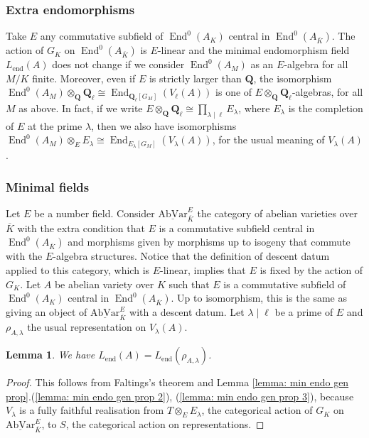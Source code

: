 \documentclass[a4paper,10pt]{amsart}
\theoremstyle{plain}
\newtheorem{lemma}[theorem]{Lemma}
\theoremstyle{definition}
\theoremstyle{remark}
\def\Q{\mathbf Q}
\newcommand{\Ql}{\Q_{\ell}}
\def\mr#1{\mathrm{#1}}
\def\AbVar{\underline{\mathrm{AbVar}}}
\DeclareMathOperator{\End}{End}
\begin{document}
\subsubsection{Extra endomorphisms}\label{sssec: extra end}
Take \(E\) any commutative subfield of \(\End^0(A_{K})\) central in \(\End^0(A_{\overline{K}})\). The action of \(G_K\) on \(\End^0(A_{\overline{K}})\) is \(E\)-linear and the minimal endomorphism field \(L_{\mr{end}}(A)\) does not change if we consider \(\End^0(A_{M})\) as an \(E\)-algebra for all \(M/K\) finite.
Moreover, even if \(E\) is strictly larger than \(\Q\), the isomorphism \(\End^0(A_{M}) \otimes_{\Q} \Ql \cong \End_{\Ql[G_M]}(V_\ell(A))\) is one of \(E \otimes_\Q \Ql\)-algebras, for all \(M\) as above. In fact, if we write \(E \otimes_\Q \Ql \cong \prod_{\lambda \mid \ell} E_\lambda\), where \(E_\lambda\) is the completion of \(E\) at the prime \(\lambda\), then we also have isomorphisms \(\End^0(A_{M}) \otimes_{E} E_{\lambda} \cong \End_{E_{\lambda}[G_M]}(V_\lambda(A))\), for the usual meaning of \(V_\lambda(A)\).

\subsubsection{Minimal fields}
Let \(E\) be a number field. Consider \(\AbVar_{\overline{K}}^E\) the category of abelian varieties over \(\overline{K}\) with the extra condition that \(E\) is a commutative subfield central in \(\End^0(A_{\overline{K}})\) and morphisms given by morphisms up to isogeny that commute with the \(E\)-algebra structures. Notice that the definition of descent datum applied to this category, which is \(E\)-linear, implies that \(E\) is fixed by the action of \(G_K\). Let \(A\) be abelian variety over \(K\) such that \(E\) is a commutative subfield of \(\End^0(A_{K})\) central in \(\End^0(A_{\overline{K}})\). Up to isomorphism, this is the same as giving an object of \(\AbVar_{\overline{K}}^E\) with a descent datum. Let \(\lambda \mid \ell\) be a prime of \(E\) and \(\rho_{A, \lambda}\) the usual representation on \(V_\lambda(A)\).
\begin{lemma}\label{lemma: min endo of ab is repth}
We have \(L_{\mr{end}}(A) = L_{\mr{end}}(\rho_{A, \lambda})\).
\end{lemma}
\begin{proof}
This follows from Faltings's theorem and Lemma \ref{lemma: min endo gen prop}.(\ref{lemma: min endo gen prop 2}), (\ref{lemma: min endo gen prop 3}), because \(V_\lambda\) is a fully faithful realisation from \(T \otimes_E E_\lambda\), the categorical action of \(G_K\) on \(\AbVar_{\overline{K}}^E\), to \(S\), the categorical action on representations. 
\end{proof}
\end{document}
